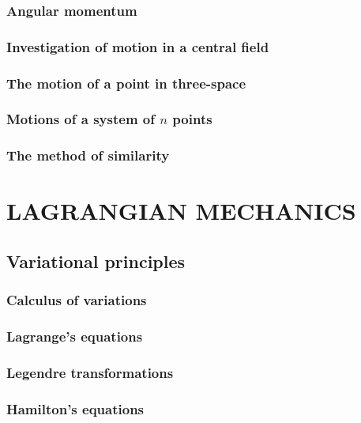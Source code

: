 \documentclass{book}
\numberwithin{equation}{section}
\theoremstyle{plain}
\theoremstyle{definition}
\theoremstyle{remark}
\theoremstyle{remark}
\begin{document}
\section{Angular momentum}

\section{Investigation of motion in a central field}

\section{The motion of a point in three-space}

\section{Motions of a system of $n$ points}

\section{The method of similarity}

\part{LAGRANGIAN MECHANICS}

\chapter{Variational principles}

\section{Calculus of variations}

\section{Lagrange's equations}

\section{Legendre transformations}

\section{Hamilton's equations}
\end{document}
